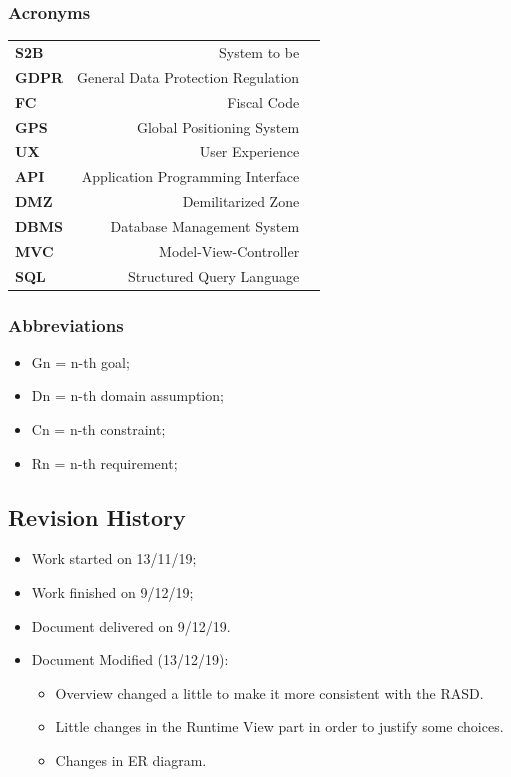 \documentclass[titlepage]{article}
\begin{document}
\subsubsection{Acronyms}
\begin{tabular}{|l|rl|}
\hline

\textbf{S2B}	& System to be 	&				 			 \\
\textbf{GDPR}	& General Data Protection Regulation &	     \\
\textbf{FC}     & Fiscal Code    	&	 				 \\
\textbf{GPS}    & Global Positioning System &	 			 \\
\textbf{UX}		& User Experience & 
\\
\textbf{API}	& Application Programming Interface &
\\

\textbf{DMZ}	& Demilitarized Zone & 
\\
\textbf{DBMS}	& Database Management System &
\\
\textbf{MVC}	& Model-View-Controller &
\\
\textbf{SQL}	& Structured Query Language &
\\
\hline
\end{tabular}
\subsubsection{Abbreviations}
\begin{itemize}
	\item Gn = n-th goal;
	\item Dn = n-th domain assumption;
	\item Cn = n-th constraint;
	\item Rn = n-th requirement;
\end{itemize}
\subsection{Revision History}
\begin{itemize}
\item Work started on 13/11/19;
\item Work finished on 9/12/19;
\item Document delivered on 9/12/19.
\item Document Modified (13/12/19):
	\begin{itemize}
	\item Overview changed a little to make it more consistent with the RASD.
	\item Little changes in the Runtime View part in order to justify some choices.
	\item Changes in ER diagram.
	\end{itemize}
\end{itemize}
\end{document}
